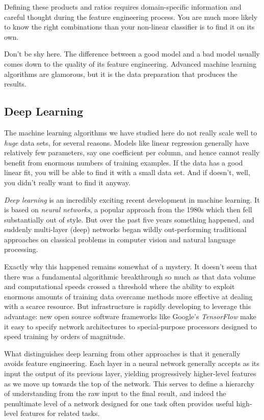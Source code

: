 \documentclass[10pt]{article}
\begin{document}
\begin{enumerate}
Defining these products and ratios requires domain-specific information and careful thought during the feature engineering process. You are much more likely to know the right combinations than your non-linear classifier is to find it on its own.

Don’t be shy here. The difference between a good model and a bad model usually comes down to the quality of its feature engineering. Advanced machine learning algorithms are glamorous, but it is the data preparation that produces the results.

\subsection{Deep Learning}
The machine learning algorithms we have studied here do not really scale well to \textit{huge} data sets, for several reasons. Models like linear regression generally have relatively few parameters, say one coefficient per column, and hence cannot really benefit from enormous numbers of training examples. If the data has a good linear fit, you will be able to find it with a small data set. And if doesn’t, well, you didn’t really want to find it anyway.

\textit{Deep learning} is an incredibly exciting recent development in machine learning. It is based on \textit{neural networks}, a popular approach from the 1980s which then fell substantially out of style. But over the past five years something happened, and suddenly multi-layer (deep) networks began wildly out-performing traditional approaches on classical problems in computer vision and natural language processing.

Exactly why this happened remains somewhat of a mystery. It doesn’t seem that there was a fundamental algorithmic breakthrough so much as that data volume and computational speeds crossed a threshold where the ability to exploit enormous amounts of training data overcame methods more effective at dealing with a scarce resource. But infrastructure is rapidly developing to leverage this advantage: new open source software frameworks like Google’s \textit{TensorFlow} make it easy to specify network architectures to special-purpose processors designed to speed training by orders of magnitude.

What distinguishes deep learning from other approaches is that it generally avoids feature engineering. Each layer in a neural network generally accepts as its input the output of its previous layer, yielding progressively higher-level features as we move up towards the top of the network. This serves to define a hierarchy of understanding from the raw input to the final result, and indeed the penultimate level of a network designed for one task often provides useful high-level features for related tasks.


\end{enumerate}
\end{document}
